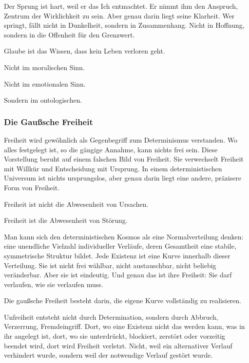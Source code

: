 \documentclass[
  ngerman,
]{article}
\begin{document}
Der Sprung ist hart, weil er das Ich entmachtet. Er nimmt ihm den
Anspruch, Zentrum der Wirklichkeit zu sein. Aber genau darin liegt seine
Klarheit. Wer springt, fällt nicht in Dunkelheit, sondern in
Zusammenhang. Nicht in Hoffnung, sondern in die Offenheit für den
Grenzwert.

Glaube ist das Wissen, dass kein Leben verloren geht.

Nicht im moralischen Sinn.

Nicht im emotionalen Sinn.

Sondern im ontologischen.

\subsubsection{\texorpdfstring{\hfill\break
}{ }}\label{section-6}

\subsubsection{\texorpdfstring{\textbf{Die Gaußsche
Freiheit}}{Die Gaußsche Freiheit}}\label{die-gauuxdfsche-freiheit}

Freiheit wird gewöhnlich als Gegenbegriff zum Determinismus verstanden.
Wo alles festgelegt ist, so die gängige Annahme, kann nichts frei sein.
Diese Vorstellung beruht auf einem falschen Bild von Freiheit. Sie
verwechselt Freiheit mit Willkür und Entscheidung mit Ursprung. In einem
deterministischen Universum ist nichts ursprungslos, aber genau darin
liegt eine andere, präzisere Form von Freiheit.

Freiheit ist nicht die Abwesenheit von Ursachen.

Freiheit ist die Abwesenheit von Störung.

Man kann sich den deterministischen Kosmos als eine Normalverteilung
denken: eine unendliche Vielzahl individueller Verläufe, deren
Gesamtheit eine stabile, symmetrische Struktur bildet. Jede Existenz ist
eine Kurve innerhalb dieser Verteilung. Sie ist nicht frei wählbar,
nicht austauschbar, nicht beliebig veränderbar. Aber sie ist eindeutig.
Und genau das ist ihre Freiheit: Sie darf verlaufen, wie sie verlaufen
muss.

Die gaußsche Freiheit besteht darin, die eigene Kurve vollständig zu
realisieren.

Unfreiheit entsteht nicht durch Determination, sondern durch Abbruch,
Verzerrung, Fremdeingriff. Dort, wo eine Existenz nicht das werden kann,
was in ihr angelegt ist, dort, wo sie unterdrückt, blockiert, zerstört
oder vorzeitig beendet wird, dort wird Freiheit verletzt. Nicht, weil
ein alternativer Verlauf verhindert wurde, sondern weil der notwendige
Verlauf gestört wurde.
\end{document}
